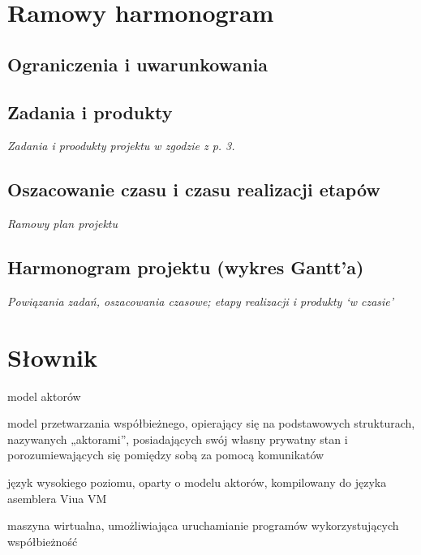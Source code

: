 \documentclass[11pt,oneside,a4paper,titlepage,onecolumn]{article}
\begin{document}
\section{Ramowy harmonogram}

\subsection{Ograniczenia i uwarunkowania}

\subsection{Zadania i produkty}

\emph{Zadania i proodukty projektu w zgodzie z p. 3.}

\subsection{Oszacowanie czasu i czasu realizacji etapów}

\emph{Ramowy plan projektu}

\subsection{Harmonogram projektu (wykres Gantt’a)}

\emph{Powiązania zadań, oszacowania czasowe; etapy realizacji i produkty ‘w czasie’}

\section{Słownik}

\begin{labeling}{model aktorów}
    \item [model aktorów] model przetwarzania współbieżnego, opierający się na podstawowych strukturach, nazywanych „aktorami”, posiadających swój własny prywatny stan i porozumiewających się pomiędzy sobą za pomocą komunikatów
    \item [ViuAct] język wysokiego poziomu, oparty o modelu aktorów, kompilowany do języka asemblera Viua VM
    \item [Viua VM] maszyna wirtualna, umożliwiająca uruchamianie programów wykorzystujących współbieżność
\end{labeling}
\end{document}
